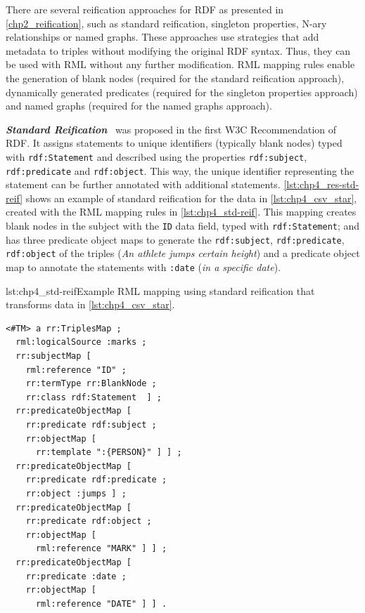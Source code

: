 There are several reification approaches for RDF as presented in \cref{chp2_reification}, such as standard reification, singleton properties, N-ary relationships or named graphs. 
These approaches use strategies that add metadata to triples
without modifying the original RDF syntax.
Thus, they can be used with RML without any further modification. RML mapping rules enable the generation of blank nodes (required for the standard reification approach), dynamically generated predicates (required for the singleton properties approach) and named graphs (required for the named graphs approach). %



\noindent\textbf{\textit{Standard Reification}}~\citep{lassila1999rdf} was proposed in the first W3C Recommendation of RDF.
It assigns statements to unique identifiers (typically blank nodes) typed with \texttt{rdf:Statement} and described using the properties \texttt{rdf:subject}, \texttt{rdf:predicate} and \texttt{rdf:object}.
This way, the unique identifier representing the statement can be further annotated with additional statements. \cref{lst:chp4_res-std-reif} shows an example of standard reification for the data in \cref{lst:chp4_csv_star}, created with the RML mapping rules in \cref{lst:chp4_std-reif}. 
This mapping creates blank nodes in the subject with the \texttt{ID} data field, typed with \texttt{rdf:Statement}; and has three predicate object maps to generate the \texttt{rdf:subject}, \texttt{rdf:predicate}, \texttt{rdf:object} of the triples (\textit{An athlete jumps certain height}) and a predicate object map to annotate the statements with \texttt{:date} (\textit{in a specific date}).




\begin{minipage}{\linewidth}
\begin{captionedlisting}{lst:chp4_std-reif}{Example RML mapping using standard reification that transforms data in \cref{lst:chp4_csv_star}.}
\centering
\begin{multicols}{2}
{\begin{lstlisting}[basicstyle=\ttfamily\small,label={list:example1},columns=flexible]
<#TM> a rr:TriplesMap ;
  rml:logicalSource :marks ;
  rr:subjectMap [ 
    rml:reference "ID" ;
    rr:termType rr:BlankNode ;
    rr:class rdf:Statement  ] ;
  rr:predicateObjectMap [ 
    rr:predicate rdf:subject ;
    rr:objectMap [
      rr:template ":{PERSON}" ] ] ;
  rr:predicateObjectMap [ 
    rr:predicate rdf:predicate ;
    rr:object :jumps ] ;
  rr:predicateObjectMap [ 
    rr:predicate rdf:object ;
    rr:objectMap [
      rml:reference "MARK" ] ] ;
  rr:predicateObjectMap [ 
    rr:predicate :date ;
    rr:objectMap [
      rml:reference "DATE" ] ] .
\end{lstlisting}}
\end{multicols}
\end{captionedlisting}
\end{minipage}

